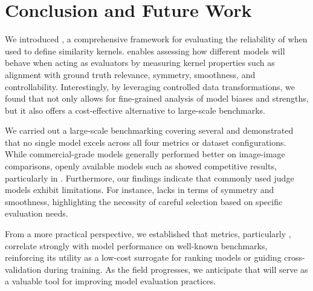 \vspace{-5mm}
\section{Conclusion and Future Work}
\vspace{-1mm}
We introduced \mmscore{}, a comprehensive framework for evaluating the reliability of \modelss{} when used to define similarity kernels. \mmscore{} enables assessing how different models will behave when acting as evaluators by measuring kernel properties such as alignment with ground truth relevance, symmetry, smoothness, and controllability. Interestingly, by leveraging controlled data transformations, we found that \mmscore{} not only allows for fine-grained analysis of model biases and strengths, but it also offers a cost-effective alternative to large-scale benchmarks.

\vspace{-0.5mm}

We carried out a large-scale benchmarking covering several \modelss{} and demonstrated that no single model excels across all four metrics or dataset configurations. While commercial-grade models generally performed better on image-image comparisons, openly available models such as \internvlTwoFiveEightB{} showed competitive results, particularly in \nmi. Furthermore, our findings indicate that commonly used judge models exhibit limitations. For instance, \gptFouroEleven{} lacks in terms of symmetry and smoothness, highlighting the necessity of careful selection based on specific evaluation needs.

\vspace{-0.5mm}

From a more practical perspective, we established that \mmscore{} metrics, particularly \nmi{}, correlate strongly with model performance on well-known benchmarks, reinforcing its utility as a low-cost surrogate for ranking models or guiding cross-validation during training. As the field progresses, we anticipate that \mmscore{} will serve as a valuable tool for improving model evaluation practices. 

